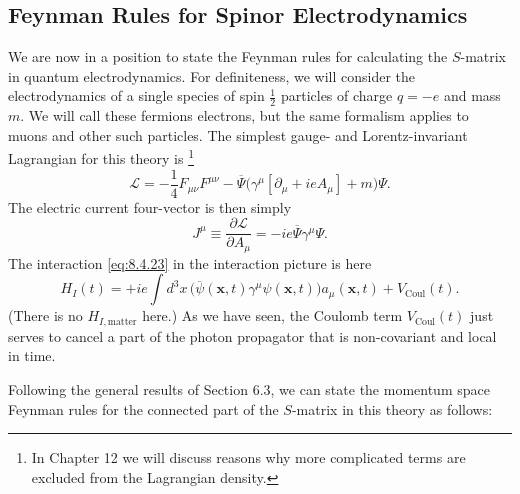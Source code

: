 
\subsection{Feynman Rules for Spinor Electrodynamics}

We are now in a position to state the Feynman rules for calculating the
$S$-matrix in quantum electrodynamics. For definiteness, we will consider the
electrodynamics of a single species of spin $\frac12$ particles of charge
$q=-e$ and mass $m$. We will call these fermions electrons, but the same
formalism applies to muons and other such particles. The simplest gauge- and
Lorentz-invariant Lagrangian for this theory is%
\footnote{In Chapter 12 we will discuss reasons why more complicated terms are
excluded from the Lagrangian density.}
\begin{equation}
\mathcal L=-\frac14F_{\mu\nu}F^{\mu\nu}
-\overline\Psi\bigl(\gamma^\mu[\partial_\mu+ieA_\mu]+m\bigr)\Psi.
\tag{8.6.1}\label{eq:8.6.1}
\end{equation}
The electric current four-vector is then simply
\begin{equation}
J^\mu\equiv\frac{\partial\mathcal L}{\partial A_\mu}
=-ie\overline\Psi\gamma^\mu\Psi.
\tag{8.6.2}\label{eq:8.6.2}
\end{equation}
The interaction \eqref{eq:8.4.23} in the interaction picture is here
\begin{equation}
H_I(t)=+ie\int d^3x\,
\bigl(\overline\psi(\mathbf x,t)\gamma^\mu\psi(\mathbf x,t)\bigr)
a_\mu(\mathbf x,t)+V_{\mathrm{Coul}}(t).
\tag{8.6.3}\label{eq:8.6.3}
\end{equation}
(There is no $H_{I,\mathrm{matter}}$ here.) As we have seen, the Coulomb term
$V_{\mathrm{Coul}}(t)$ just serves to cancel a part of the photon propagator
that is non-covariant and local in time.

Following the general results of Section 6.3, we can state the momentum space
Feynman rules for the connected part of the $S$-matrix in this theory as
follows:

